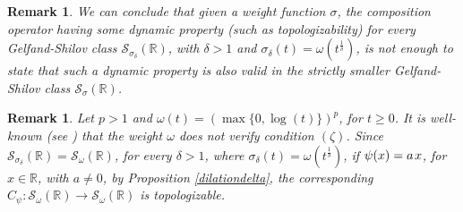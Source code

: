\documentclass[12pt,reqno]{amsart} %
\newtheorem{remark}[theorem]{Remark}
\newtheorem{corollary}[theorem]{Corollary}
\numberwithin{equation}{section}
\begin{document}
				\begin{remark} We can conclude that 
					given a weight function $\sigma$, the composition operator having some dynamic property (such as topologizability) for every Gelfand-Shilov class $\mathcal{S}_{\sigma_\delta}(\mathbb{R})$, with $\delta>1$ and $\sigma_\delta(t)=\omega(t^{\frac{1}{\delta}})$, is not enough to state that such a dynamic property is also valid in the strictly smaller Gelfand-Shilov class $\mathcal{S}_{\sigma}(\mathbb{R})$.
				\end{remark}
				
				\begin{remark}
 Let $p>1$ and $\omega(t)=\left(\max\{0,\log(t)\}\right)^p$, for $t\geq 0$. It is well-known (see \cite[20. Example]{BMM}) that the weight $\omega$ does not verify condition $(\zeta)$. Since $\mathcal{S}_{\sigma_\delta}(\mathbb{R})=\mathcal{S}_{\omega}(\mathbb{R})$, for every $\delta>1$, where $\sigma_\delta(t)=\omega(t^{\frac{1}{\delta}})$, if $\psi(x)=a \hspace{0.04cm}x$, for $x\in \mathbb{R}$, with $a\not =0$, by Proposition \ref{dilationdelta}, the corresponding $C_\psi: \mathcal{S}_{\omega}(\mathbb{R})\to \mathcal{S}_{\omega}(\mathbb{R})$ is topologizable.
				\end{remark}
				
\end{document}
